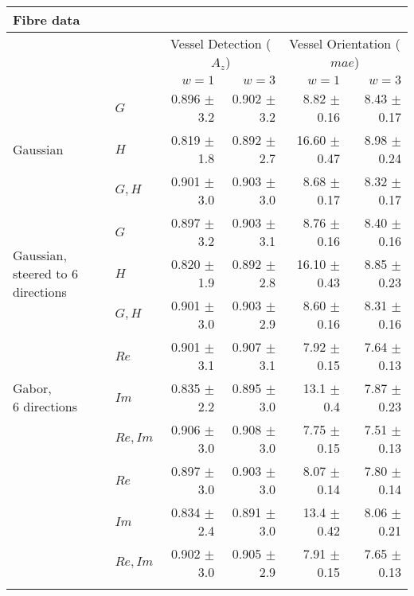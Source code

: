\begin{tabularx}{\linewidth}{X X r r r r}
\toprule
\multicolumn{6}{l}{Fibre data} \\
\midrule
            &
            & \multicolumn{2}{c}{Vessel Detection \linebreak ($A_z$)}
            & \multicolumn{2}{c}{Vessel Orientation \linebreak ($mae$)}  \\
            &           & $w = 1$         & $w = 3$         &   $w = 1$       &   $w = 3$   \\
\midrule
\multirow{3}{3cm}{ Gaussian }
            & $G$         & 0.896 $\pm$ 3.2 & 0.902 $\pm$ 3.2 & 8.82 $\pm$ 0.16   & 8.43 $\pm$ 0.17 \\
            & $H$         & 0.819 $\pm$ 1.8 & 0.892 $\pm$ 2.7 & 16.60 $\pm$ 0.47  & 8.98 $\pm$ 0.24 \\
            & $G, H$      & 0.901 $\pm$ 3.0 & 0.903 $\pm$ 3.0 & 8.68 $\pm$ 0.17   & 8.32 $\pm$ 0.17 \\
\midrule
\multirow{3}{3cm}{Gaussian, \newline steered to 6 directions}
            & $G$       & 0.897 $\pm$ 3.2   & 0.903 $\pm$ 3.1 & 8.76 $\pm$ 0.16   & 8.40 $\pm$ 0.16 \\
            & $H$       & 0.820 $\pm$ 1.9   & 0.892 $\pm$ 2.8 & 16.10 $\pm$ 0.43  & 8.85 $\pm$ 0.23 \\
            & $G,H$     & 0.901 $\pm$ 3.0   & 0.903 $\pm$ 2.9 & 8.60 $\pm$ 0.16   & 8.31 $\pm$ 0.16 \\
\midrule
\multirow{3}{3cm}{Gabor, \newline 6 directions}
            & $Re$      & 0.901 $\pm$ 3.1   & 0.907 $\pm$ 3.1 & 7.92 $\pm$ 0.15   & 7.64 $\pm$ 0.13 \\
            & $Im$      & 0.835 $\pm$ 2.2   & 0.895 $\pm$ 3.0 & 13.1 $\pm$ 0.4    & 7.87 $\pm$ 0.23 \\
            & $Re,Im$   & 0.906 $\pm$ 3.0   & 0.908 $\pm$ 3.0 & 7.75 $\pm$ 0.15   & 7.51 $\pm$ 0.13 \\
\midrule
\multirow{3}{3cm}{\dtcwt{}}
            & $Re$      & 0.897 $\pm$ 3.0   & 0.903 $\pm$ 3.0 &  8.07 $\pm$ 0.14 & 7.80 $\pm$ 0.14 \\
            & $Im$      & 0.834 $\pm$ 2.4   & 0.891 $\pm$ 3.0 &  13.4 $\pm$ 0.42 & 8.06 $\pm$ 0.21 \\
            & $Re,Im$   & 0.902 $\pm$ 3.0   & 0.905 $\pm$ 2.9 &  7.91 $\pm$ 0.15 & 7.65 $\pm$ 0.13 \\

\bottomrule
\noalign{\smallskip}
\end{tabularx}
